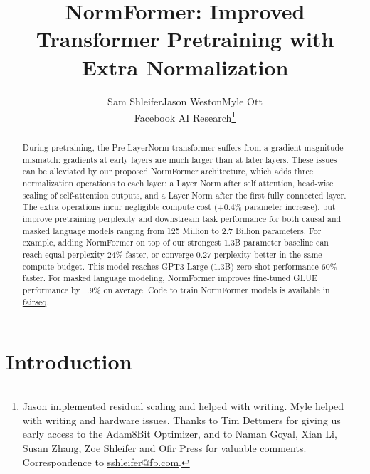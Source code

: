 \documentclass{article} %
\title{NormFormer: Improved Transformer Pretraining with Extra Normalization}
\author{Sam Shleifer\hspace{1em}Jason Weston\hspace{1em}Myle Ott \\
\hspace{5em}Facebook AI Research\thanks{
Jason implemented residual scaling and helped with writing. Myle helped with writing and hardware issues. Thanks to Tim Dettmers for giving us early access to the Adam8Bit Optimizer, and to Naman Goyal, Xian Li, Susan Zhang, Zoe Shleifer and Ofir Press for valuable comments. Correspondence to \url{sshleifer@fb.com}. 
}
 }
\begin{document}
\begin{center}
\maketitle
\end{center}

\begin{abstract}
During pretraining, the Pre-LayerNorm transformer suffers from a gradient magnitude mismatch: gradients at early layers are much larger than at later layers. These issues can be alleviated by our proposed NormFormer architecture, which adds three normalization operations to each layer: a Layer Norm after self attention, head-wise scaling of self-attention outputs, and a Layer Norm after the first fully connected layer.
The extra operations incur negligible compute cost (+0.4\% parameter increase), but improve pretraining perplexity and downstream task performance for both causal and masked language models ranging from 125 Million to 2.7 Billion parameters.
For example, adding NormFormer on top of our strongest 1.3B parameter baseline can reach equal perplexity 24\% faster, or converge 0.27 perplexity better in the same compute budget. This model reaches GPT3-Large (1.3B) zero shot performance 60\% faster.
For masked language modeling, NormFormer improves fine-tuned GLUE performance by 1.9\% on average. Code to train NormFormer models is available in \href{https://github.com/pytorch/fairseq/tree/main/examples/normformer}{fairseq}.
\end{abstract}

\section{Introduction}
\end{document}
